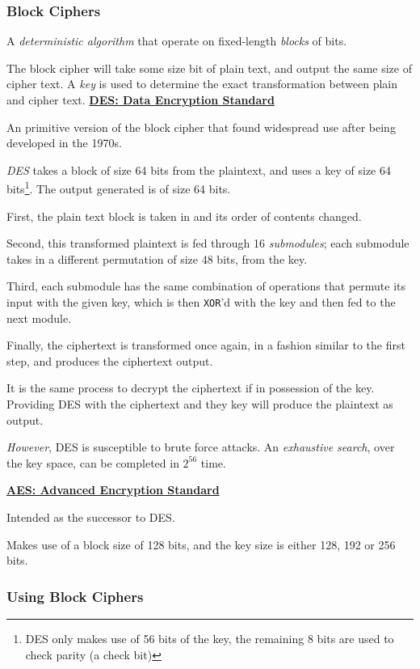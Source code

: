 \documentclass{article}
\begin{document}
\subsubsection{Block Ciphers}

A \textit{deterministic algorithm} that operate on fixed-length \textit{blocks} of bits.

The block cipher will take some size bit of plain text, and output the same size of cipher text. A \textit{key} is used to determine the exact transformation between plain and cipher text.
\newpage
\textbf{\underline{DES: Data Encryption Standard}}

An primitive version of the block cipher that found widespread use after being developed in the 1970s.

\textit{DES} takes a block of size 64 bits from the plaintext, and uses a key of size 64 bits\footnote{DES only makes use of 56 bits of the key, the remaining 8 bits are used to check parity (a check bit)}. The output generated is of size 64 bits.

First, the plain text block is taken in and its order of contents changed.

Second, this transformed plaintext is fed through 16 \textit{submodules}; each submodule takes in a different permutation of size 48 bits, from the key.

Third, each submodule has the same combination of operations that permute its input with the given key, which is then \texttt{XOR}'d with the key and then fed to the next module.

Finally, the ciphertext is transformed once again, in a fashion similar to the first step, and produces the ciphertext output.

It is the same process to decrypt the ciphertext if in possession of the key. Providing DES with the ciphertext and they key will produce the plaintext as output.

\textit{However}, DES is susceptible to brute force attacks. An \textit{exhaustive search}, over the key space, can be completed in $2^{56}$ time.

\textbf{\underline{AES: Advanced Encryption Standard}}

Intended as the successor to DES.

Makes use of a block size of 128 bits, and the key size is either 128, 192 or 256 bits.

\subsubsection{Using Block Ciphers}
\end{document}
